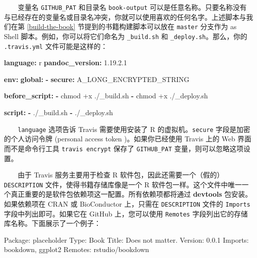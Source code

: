 \documentclass[
  12pt,
]{krantz}
\newenvironment{Shaded}{\begin{snugshade}}{\end{snugshade}}
\newcommand{\AttributeTok}[1]{\textcolor[rgb]{0.13,0.29,0.53}{#1}}
\newcommand{\FloatTok}[1]{\textcolor[rgb]{0.00,0.00,0.81}{#1}}
\newcommand{\FunctionTok}[1]{\textcolor[rgb]{0.13,0.29,0.53}{\textbf{#1}}}
\newcommand{\KeywordTok}[1]{\textcolor[rgb]{0.13,0.29,0.53}{\textbf{#1}}}
\newcommand{\NormalTok}[1]{#1}
\theoremstyle{definition}
\theoremstyle{definition}
\theoremstyle{definition}
\theoremstyle{definition}
\theoremstyle{remark}
\begin{document}
  变量名 \texttt{GITHUB\_PAT} 和目录名 \texttt{book-output} 可以是任意名称。只要名称没有与已经存在的变量名或目录名冲突，你就可以使用喜欢的任何名字。上述脚本与我们在第 \ref{build-the-book} 节提到的书籍构建脚本可以放在 \texttt{master} 分支作为 as Shell 脚本。例如，你可以将它们命名为 \texttt{\_build.sh} 和 \texttt{\_deploy.sh}。那么，你的 \texttt{.travis.yml} 文件可能是这样的：

\begin{Shaded}
\begin{Highlighting}[]
\FunctionTok{language}\KeywordTok{:}\AttributeTok{ r}
\FunctionTok{pandoc\_version}\KeywordTok{:}\AttributeTok{ }\FloatTok{1.19.2.1}

\FunctionTok{env}\KeywordTok{:}
\AttributeTok{  }\FunctionTok{global}\KeywordTok{:}
\AttributeTok{    }\KeywordTok{{-}}\AttributeTok{ }\FunctionTok{secure}\KeywordTok{:}\AttributeTok{ A\_LONG\_ENCRYPTED\_STRING}

\FunctionTok{before\_script}\KeywordTok{:}
\AttributeTok{  }\KeywordTok{{-}}\AttributeTok{ chmod +x ./\_build.sh}
\AttributeTok{  }\KeywordTok{{-}}\AttributeTok{ chmod +x ./\_deploy.sh}

\FunctionTok{script}\KeywordTok{:}
\AttributeTok{  }\KeywordTok{{-}}\AttributeTok{ ./\_build.sh}
\AttributeTok{  }\KeywordTok{{-}}\AttributeTok{ ./\_deploy.sh}
\end{Highlighting}
\end{Shaded}

  \texttt{language} 选项告诉 Travis 需要使用安装了 R 的虚拟机。\texttt{secure} 字段是加密的个人访问令牌 (personal access token )。如果你已经使用 Travis 上的 Web 界面而不是命令行工具 \texttt{travis\ encrypt} 保存了 \texttt{GITHUB\_PAT} 变量，则可以忽略这项设置。

  由于 Travis 服务主要用于检查 R 软件包，因此还需要一个（假的）\texttt{DESCRIPTION} 文件，使得书籍存储库像是一个 R 软件包一样。这个文件中唯一一个真正重要的是软件包依赖项这一配置。所有依赖项都将通过 \textbf{devtools} 包安装。如果依赖项在 CRAN 或 BioConductor 上，只需在 \texttt{DESCRIPTION} 文件的 \texttt{Imports} 字段中列出即可。如果它在 GitHub 上，您可以使用 \texttt{Remotes} 字段列出它的存储库名称。下面展示了一个例子：

\begin{Shaded}
\begin{Highlighting}[]
\NormalTok{Package: placeholder}
\NormalTok{Type: Book}
\NormalTok{Title: Does not matter.}
\NormalTok{Version: 0.0.1}
\NormalTok{Imports: bookdown, ggplot2}
\NormalTok{Remotes: rstudio/bookdown}
\end{Highlighting}
\end{Shaded}
\end{document}
